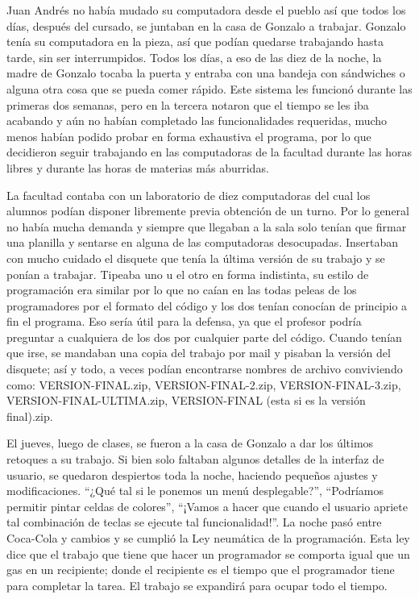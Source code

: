 \documentclass[12pt,twoside,openright]{book}
\begin{document}
Juan Andrés no había mudado su computadora desde el pueblo así que todos los días, después del cursado, se juntaban en la casa de Gonzalo a trabajar. Gonzalo tenía su computadora en la pieza, así que podían quedarse trabajando hasta tarde, sin ser interrumpidos. Todos los días, a eso de las diez de la noche, la madre de Gonzalo tocaba la puerta y entraba con una bandeja con sándwiches o alguna otra cosa que se pueda comer rápido. Este sistema les funcionó durante las primeras dos semanas, pero en la tercera notaron que el tiempo se les iba acabando y aún no habían completado las funcionalidades requeridas, mucho menos habían podido probar en forma exhaustiva el programa, por lo que decidieron seguir trabajando en las computadoras de la facultad durante las horas libres y durante las horas de materias más aburridas.

La facultad contaba con un laboratorio de diez computadoras del cual los alumnos podían disponer libremente previa obtención de un turno. Por lo general no había mucha demanda y siempre que llegaban a la sala solo tenían que firmar una planilla y sentarse en alguna de las computadoras desocupadas. Insertaban con mucho cuidado el disquete que tenía la última versión de su trabajo y se ponían a trabajar. Tipeaba uno u el otro en forma indistinta, su estilo de programación era similar por lo que no caían en las todas peleas de los programadores por el formato del código y los dos tenían conocían de principio a fin el programa. Eso sería útil para la defensa, ya que el profesor podría preguntar a cualquiera de los dos por cualquier parte del código. Cuando tenían que irse, se mandaban una copia del trabajo por mail y pisaban la versión del disquete; así y todo, a veces podían encontrarse nombres de archivo conviviendo como: VERSION-FINAL.zip, VERSION-FINAL-2.zip, VERSION-FINAL-3.zip, VERSION-FINAL-ULTIMA.zip, VERSION-FINAL (esta si es la versión final).zip.

El jueves, luego de clases, se fueron a la casa de Gonzalo a dar los últimos retoques a su trabajo. Si bien solo faltaban algunos detalles de la interfaz de usuario, se quedaron despiertos toda la noche, haciendo pequeños ajustes y modificaciones. “¿Qué tal si le ponemos un menú desplegable?”, “Podríamos permitir pintar celdas de colores”, “¡Vamos a hacer que cuando el usuario apriete tal combinación de teclas se ejecute tal funcionalidad!”. La noche pasó entre Coca-Cola y cambios y se cumplió la Ley neumática de la programación. Esta ley dice que el trabajo que tiene que hacer un programador se comporta igual que un gas en un recipiente; donde el recipiente es el tiempo que el programador tiene para completar la tarea. El trabajo se expandirá para ocupar todo el tiempo.
\end{document}
